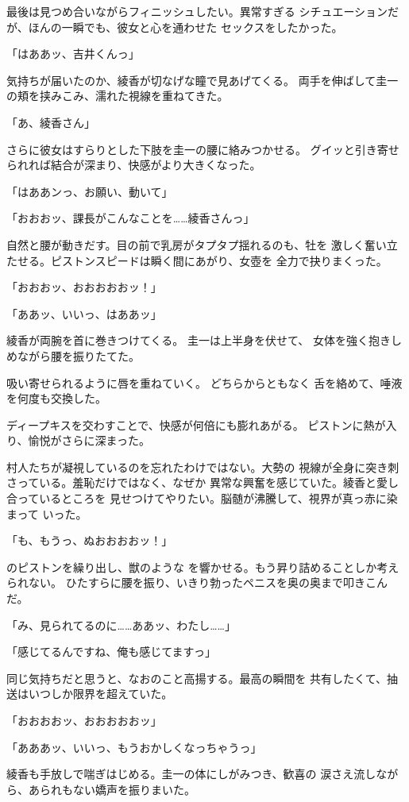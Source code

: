 ﻿\documentclass[
    book,tate,
    line_length=30zw,
    jafontsize=12pt,
    paper=b5j,
    landscape,
    ]{jlreq}
\begin{document}
最後は見つめ合いながらフィニッシュしたい。異常すぎる
シチュエーションだが、ほんの一瞬でも、彼女と心を通わせた
セックスをしたかった。

「はああッ、吉井くんっ」

気持ちが届いたのか、綾香が切なげな瞳で見あげてくる。
両手を伸ばして圭一の頬を挟みこみ、濡れた視線を重ねてきた。

「あ、綾香さん」

さらに彼女はすらりとした下肢を圭一の腰に絡みつかせる。
グイッと引き寄せられれば結合が深まり、快感がより大きくなった。

「はああンっ、お願い、動いて」

「おおおッ、課長がこんなことを……綾香さんっ」

自然と腰が動きだす。目の前で乳房がタプタプ揺れるのも、牡を
激しく奮い立たせる。ピストンスピードは瞬く間にあがり、女壺を
全力で抉りまくった。

「おおおッ、おおおおおッ！」

「ああッ、いいっ、はああッ」

綾香が両腕を首に巻きつけてくる。 圭一は上半身を伏せて、
女体を強く抱きしめながら腰を振りたてた。

吸い寄せられるように唇を重ねていく。 どちらからともなく
舌を絡めて、唾液を何度も交換した。

ディープキスを交わすことで、快感が何倍にも膨れあがる。
ピストンに熱が入り、愉悦がさらに深まった。

村人たちが凝視しているのを忘れたわけではない。大勢の
視線が全身に突き刺さっている。羞恥だけではなく、なぜか
異常な興奮を感じていた。綾香と愛し合っているところを
見せつけてやりたい。脳髄が沸騰して、視界が真っ赤に染まって
いった。

「も、もうっ、ぬおおおおッ！」

のピストンを繰り出し、獣のような
を響かせる。もう昇り詰めることしか考えられない。
ひたすらに腰を振り、いきり勃ったペニスを奥の奥まで叩きこんだ。

「み、見られてるのに……ああッ、わたし……」

「感じてるんですね、俺も感じてますっ」

同じ気持ちだと思うと、なおのこと高揚する。最高の瞬間を
共有したくて、抽送はいつしか限界を超えていた。

「おおおおッ、おおおおおッ」

「あああッ、いいっ、もうおかしくなっちゃうっ」

綾香も手放しで喘ぎはじめる。圭一の体にしがみつき、歓喜の
涙さえ流しながら、あられもない嬌声を振りまいた。
\end{document}
